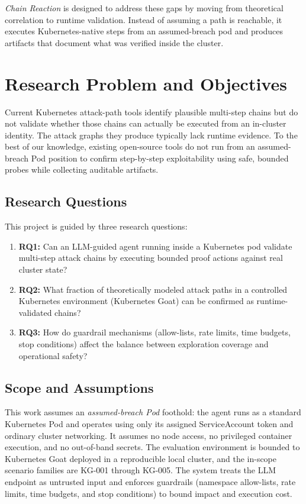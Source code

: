 \documentclass[conference]{IEEEtran}
\begin{document}
\emph{Chain Reaction} is designed to address these gaps by moving from theoretical correlation to runtime validation. Instead of assuming a path is reachable, it executes Kubernetes-native steps from an assumed-breach pod and produces artifacts that document what was verified inside the cluster.

\section{Research Problem and Objectives}
Current Kubernetes attack-path tools identify plausible multi-step chains but do not validate whether those chains can actually be executed from an in-cluster identity. The attack graphs they produce typically lack runtime evidence. To the best of our knowledge, existing open-source tools do not run from an assumed-breach Pod position to confirm step-by-step exploitability using safe, bounded probes while collecting auditable artifacts.

\subsection{Research Questions}
This project is guided by three research questions:
\begin{enumerate}
    \item \textbf{RQ1:} Can an LLM-guided agent running inside a Kubernetes pod validate multi-step attack chains by executing bounded proof actions against real cluster state?
    \item \textbf{RQ2:} What fraction of theoretically modeled attack paths in a controlled Kubernetes environment (Kubernetes Goat) can be confirmed as runtime-validated chains?
    \item \textbf{RQ3:} How do guardrail mechanisms (allow-lists, rate limits, time budgets, stop conditions) affect the balance between exploration coverage and operational safety?
\end{enumerate}

\subsection{Scope and Assumptions}
This work assumes an \emph{assumed-breach Pod} foothold: the agent runs as a standard Kubernetes Pod and operates using only its assigned ServiceAccount token and ordinary cluster networking. It assumes no node access, no privileged container execution, and no out-of-band secrets. The evaluation environment is bounded to Kubernetes Goat \cite{kubegoat2023} deployed in a reproducible local cluster, and the in-scope scenario families are KG-001 through KG-005. The system treats the LLM endpoint as untrusted input and enforces guardrails (namespace allow-lists, rate limits, time budgets, and stop conditions) to bound impact and execution cost.
\end{document}
